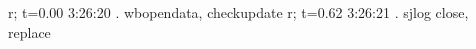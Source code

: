r; t=0.00 3:26:20
.     wbopendata, checkupdate
r; t=0.62 3:26:21
.     sjlog close, replace
{\smallskip}
